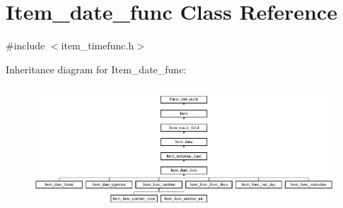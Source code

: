 \hypertarget{classItem__date__func}{}\section{Item\+\_\+date\+\_\+func Class Reference}
\label{classItem__date__func}


{\ttfamily \#include $<$item\+\_\+timefunc.\+h$>$}

Inheritance diagram for Item\+\_\+date\+\_\+func\+:\begin{figure}[H]
\begin{center}
\leavevmode
\includegraphics[height=4.725738cm]{classItem__date__func}
\end{center}
\end{figure}
